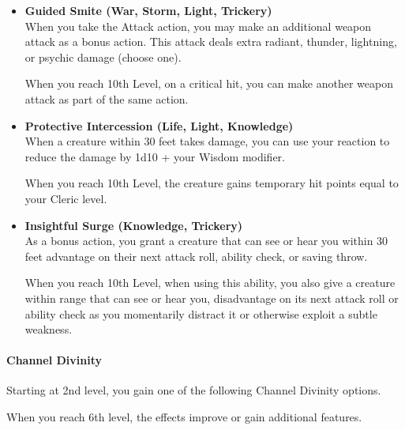 \begin{itemize}
\item
  \textbf{Guided Smite (War, Storm, Light, Trickery)}\\
  When you take the Attack action, you may make an additional weapon
  attack as a bonus action. This attack deals extra radiant, thunder,
  lightning, or psychic damage (choose one).

  When you reach 10th Level, on a critical hit, you can make another
  weapon attack as part of the same action.
\item
  \textbf{Protective Intercession (Life, Light, Knowledge)}\\
  When a creature within 30 feet takes damage, you can use your reaction
  to reduce the damage by 1d10 + your Wisdom modifier.

  When you reach 10th Level, the creature gains temporary hit points
  equal to your Cleric level.
\item
  \textbf{Insightful Surge (Knowledge, Trickery)}\\
  As a bonus action, you grant a creature that can see or hear you
  within 30 feet advantage on their next attack roll, ability check, or
  saving throw.

  When you reach 10th Level, when using this ability, you also give a
  creature within range that can see or hear you, disadvantage on its
  next attack roll or ability check as you momentarily distract it or
  otherwise exploit a subtle weakness.
\end{itemize}

\paragraph{Channel Divinity}\label{Sacred_Mandate_channel-divinity}

Starting at 2nd level, you gain one of the following Channel Divinity
options.

When you reach 6th level, the effects improve or gain additional
features.

